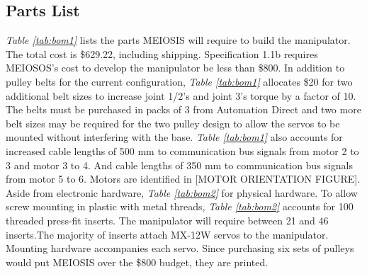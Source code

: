 \subsection*{Parts List}
\emph{Table \ref{tab:bom1}} lists the parts MEIOSIS will require to build the manipulator. The total cost is \$629.22, including shipping. Specification 1.1b requires MEIOSOS’s cost to develop the manipulator be less than \$800. In addition to pulley belts for the current configuration, \emph{Table \ref{tab:bom1}} allocates \$20 for two additional belt sizes to increase joint 1/2’s and joint 3’s torque by a factor of 10. The belts must be purchased in packs of 3 from Automation Direct and two more belt sizes may be required for the two pulley design to allow the servos to be mounted without interfering with the base. \emph{Table \ref{tab:bom1}} also accounts for increased cable lengths of 500 mm to communication bus signals from motor 2 to 3 and motor 3 to 4. And cable lengths of 350 mm to communication bus signals from motor 5 to 6. Motors are identified in [MOTOR ORIENTATION FIGURE]. Aside from electronic hardware, \emph{Table \ref{tab:bom2}} for physical hardware.
To allow screw mounting in plastic with metal threads, \emph{Table \ref{tab:bom2}} accounts for 100 threaded press-fit inserts. The manipulator will require between 21 and 46 inserts.The majority of inserts attach MX-12W servos to the manipulator. Mounting hardware accompanies each servo. Since purchasing six sets of pulleys would put MEIOSIS over the \$800 budget, they are printed.
\renewcommand{\arraystretch}{1.15}
